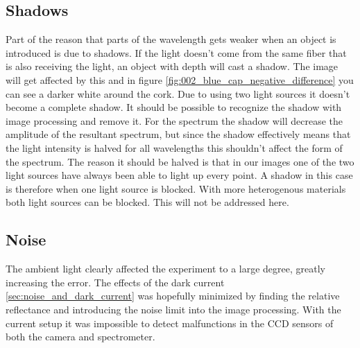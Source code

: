 \subsection{Shadows}
Part of the reason that parts of the wavelength gets weaker when an object is introduced is due to shadows. If the light doesn't come from the same fiber that is also receiving the light, an object with depth will cast a shadow. The image will get affected by this and in figure \ref{fig:002_blue_cap_negative_difference} you can see a darker white around the cork. Due to using two light sources it doesn't become a complete shadow. It should be possible to recognize the shadow with image processing and remove it. For the spectrum the shadow will decrease the amplitude of the resultant spectrum, but since the shadow effectively means that the light intensity is halved for all wavelengths this shouldn't affect the form of the spectrum. The reason it should be halved is that in our images one of the two light sources have always been able to light up every point. A shadow in this case is therefore when one light source is blocked. With more heterogenous materials both light sources can be blocked. This will not be addressed here.


\subsection{Noise}
The ambient light clearly affected the experiment to a large degree, greatly increasing the error.
The effects of the dark current \ref{sec:noise_and_dark_current} was hopefully minimized by finding the relative reflectance and introducing the noise limit into the image processing. 
With the current setup it was impossible to detect malfunctions in the CCD sensors of both the camera and spectrometer. 